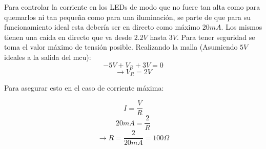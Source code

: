 Para controlar la corriente en los LEDs de modo que no fuere tan alta como para quemarlos ni tan pequeña como para una iluminación, se parte de que para su funcionamiento ideal esta debería ser en directo como máximo $20 mA$. Los mismos tienen una caída en directo que va desde $2.2V$ hasta $3V$. Para tener seguridad se toma el valor máximo de tensión posible. Realizando la malla (Asumiendo $5V$ ideales a la salida del mcu):
\[
-5V+V_R+3V = 0
\]
\[
\rightarrow V_R = 2V
\]

Para asegurar esto en el caso de corriente máxima:

\[
I = \frac{V}{R}
\]
\[
20mA = \frac{2}{R}
\]
\[
\rightarrow R = \frac{2}{20mA} = 100 \Omega
\]